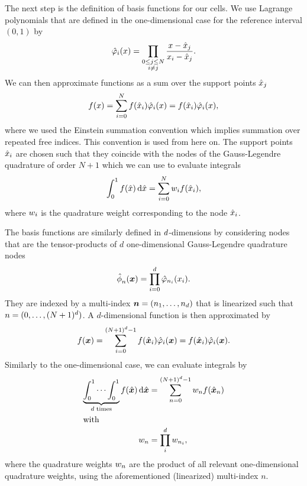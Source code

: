 The next step is the definition of basis functions for our cells.
We use Lagrange polynomials that are defined in the one-dimensional case for the reference interval $(0,1)$ by
\begin{align}
  \label{eq:lagrange-basis}
    \lagrangeRef(x) = \prod_{\substack{0 \leq j \leq N \\ i \neq j}} \frac{x - {\quadNode[j]}}{x_i - \quadNode[j]}.
\end{align}
We can then approximate functions as a sum over the support points $\quadNode[j]$
\begin{equation}
  \label{eq:langrange-expansion-1d}
  f(x) = \sum_{i = 0}^N f(\quadNode[i]) \lagrangeRef[i](x) = f(\quadNode[i]) \lagrangeRef[i](x),
\end{equation}
where we used the Einstein summation convention which implies summation over repeated free indices.
This convention is used from here on.
The support points $\quadNode[i]$ are chosen such that they coincide with the nodes of the Gauss-Legendre quadrature of order $N+1$ which we can use to evaluate integrals
\begin{equation}
  \label{eq:quadrature-1d}
  \int_0^1 f(\hat{x}) \dd{\hat{x}} = \sum_{i=0}^{N} \quadWeight[i] f(\quadNode[i]),
\end{equation}
where $\quadWeight[i]$ is the quadrature weight corresponding to the node $\quadNode[i]$.

The basis functions are similarly defined in $\dimensions$-dimensions by considering nodes that are the tensor-products of $d$ one-dimensional Gauss-Legendre quadrature nodes
\begin{equation}
  \label{eq:basis-space}
  \sbasisRef[][n] (\bm{x}) = \prod_{i=0}^{\dimensions} \lagrangeRef[n_i] (x_i).
\end{equation}
They are indexed by a multi-index $\bm{n} = (n_1, \ldots, n_\dimensions)$ that is linearized such that $n = (0, \ldots, \sbasisSize)$.
A $d$-dimensional function is then approximated by
\begin{equation}
  \label{eq:lagrange-expansion}
  f(\bm{x}) = \sum_{i = 0}^{\sbasisSize - 1} f(\quadNodeNd[i]) \lagrangeRef[i](\bm{x}) = f(\quadNodeNd[i]) \lagrangeRef[i](\bm{x}).
\end{equation}
Similarly to the one-dimensional case, we can evaluate integrals by
\begin{align}
  \label{eq:quadrature}
  \underbrace{\int_0^1 \cdots \int_0^1}_{\dimensions \text{ times}} f(\hat{\bm{x}}) \dd{\hat{\bm{x}}} &=
 \sum_{n=0}^{\sbasisSize-1} \quadWeight[n] f(\quadNodeNd[n]) \\
  \intertext{with}
  \quadWeight[n] &= \prod_{i}^{d} \quadWeight[n_i],
\end{align}
where the quadrature weights $\quadWeight[n]$ are the product of all relevant one-dimensional quadrature weights, using the aforementioned (linearized) multi-index $n$.

